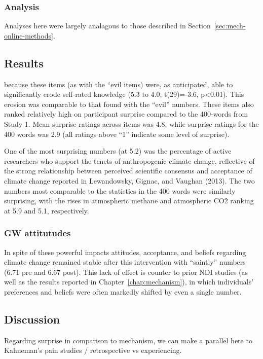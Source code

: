 \subsubsection{Analysis}

Analyses here were largely analagous to those described in
Section~\ref{sec:mech-online-methods}.

\subsection{Results}

 because
these items (as with the “evil items) were, as anticipated, able to
significantly erode self-rated knowledge (5.3 to 4.0, t(29)=-3.6, p<0.01). This
erosion was comparable to that found with the “evil” numbers. These items also
ranked relatively high on participant surprise compared to the 400-words from
Study 1. Mean surprise ratings across items was 4.8, while surprise ratings for
the 400 words was 2.9 (all ratings above “1” indicate some level of surprise).

One of the most surprising numbers (at 5.2) was the percentage of active
researchers who support the tenets of anthropogenic climate change, reflective
of the strong relationship between perceived scientific consensus and acceptance
of climate change reported in Lewandowsky, Gignac, and Vaughan (2013). The two
numbers most comparable to the statistics in the 400 words were similarly
surprising, with the rises in atmospheric methane and atmospheric CO2 ranking at
5.9 and 5.1, respectively.


\subsubsection{GW attitutudes}

In spite of these powerful impacts attitudes, acceptance, and beliefs regarding
climate change remained stable after this intervention with “saintly” numbers
(6.71 pre and 6.67 post).  This lack of effect is counter to prior NDI studies
(as well as the results reported in Chapter~\ref{chap:mechanism}), in which
individuals’ preferences and beliefs were often markedly shifted by even a
single number. 

\subsection{Discussion}

Regarding surprise in comparison to mechanism, we can make a parallel here to
Kahneman's pain studies / retrospective vs experiencing.

